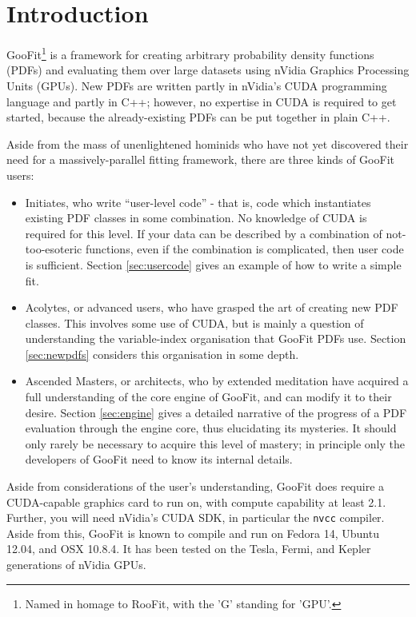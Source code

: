 \documentclass[12pt,pdflatex]{article}
\begin{document}
\section{Introduction}

GooFit\footnote{Named in homage to RooFit, with the 'G' standing for 'GPU'.}
is a framework for creating arbitrary probability density functions (PDFs) 
and evaluating them over large datasets using nVidia Graphics Processing Units (GPUs). 
New PDFs are written partly in nVidia's CUDA programming language and
partly in C++; however, no expertise in CUDA is required to get started, 
because the already-existing PDFs can be put together in plain C++. 

Aside from the mass of unenlightened hominids who have not yet discovered
their need for a massively-parallel fitting framework, there are three kinds
of GooFit users:
\begin{itemize}
\item Initiates, who write ``user-level code'' - that is, code which 
instantiates existing PDF classes in some combination. No knowledge of
CUDA is required for this level.
If your data can be described
by a combination of not-too-esoteric functions, even if the combination is 
complicated, then user code is sufficient. Section \ref{sec:usercode}
gives an example of how to write a simple fit.
\item Acolytes, or advanced users, who have grasped the art of creating new PDF classes.
This involves some use of CUDA, but is mainly a question of understanding
the variable-index organisation that GooFit PDFs use. Section \ref{sec:newpdfs}
considers this organisation in some depth.
\item Ascended Masters, or architects, who by extended meditation have 
acquired a full understanding of the core engine of GooFit, and can modify it
to their desire. Section \ref{sec:engine} gives a detailed narrative of the
progress of a PDF evaluation through the engine core, thus elucidating its
mysteries. It should only rarely be necessary to acquire this level of 
mastery; in principle only the developers of GooFit need to know its 
internal details. 
\end{itemize}

Aside from considerations of the user's understanding, GooFit does require
a CUDA-capable graphics card to run on, with compute capability at least 2.1.
Further, you will need nVidia's CUDA SDK, in particular the \texttt{nvcc} compiler.
Aside from this, GooFit is known to compile and run on Fedora 14, Ubuntu 12.04,
and OSX 10.8.4. It has been tested on the Tesla, Fermi, and Kepler
generations of nVidia GPUs. 
\end{document}
